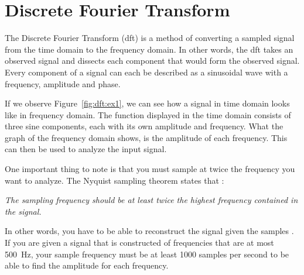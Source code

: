 \section{Discrete Fourier Transform}\label{ch:dft}
The Discrete Fourier Transform (\gls{dft}) is a method of converting a sampled signal from the time domain to the frequency domain. In other words, the \gls{dft} takes an observed signal and dissects each component that would form the observed signal. Every component of a signal can each be described as a sinusoidal wave with a frequency, amplitude and phase.

If we observe Figure~\ref{fig:dft:ex1}, we can see how a signal in time domain looks like in frequency domain. The function displayed in the time domain consists of three sine components, each with its own amplitude and frequency. What the graph of the frequency domain shows, is the amplitude of each frequency. This can then be used to analyze the input signal.

One important thing to note is that you must sample at twice the frequency you want to analyze. The Nyquist sampling theorem states that \cite{signal:aliasing}:
\begin{center}
    \textit{The sampling frequency should be at least twice the highest frequency contained in the signal.}
\end{center}
In other words, you have to be able to reconstruct the signal given the samples \cite[Ch~3]{smith1997scientist}. If you are given a signal that is constructed of frequencies that are at most 500~Hz, your sample frequency must be at least 1000 samples per second to be able to find the amplitude for each frequency.

